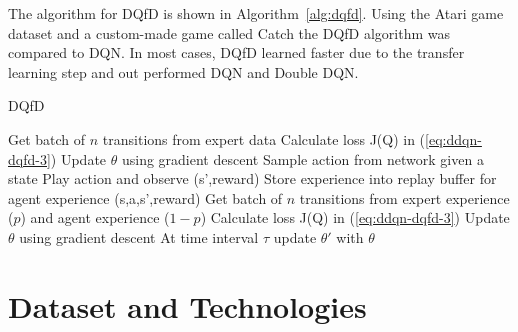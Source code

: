 \documentclass[12pt,american]{report}
\begin{document}
The algorithm for DQfD is shown in Algorithm~\ref{alg:dqfd}. Using the Atari game dataset and a custom-made game called Catch the DQfD algorithm was compared to DQN.  In most cases, DQfD learned faster due to the transfer learning step and out performed DQN and Double DQN.
\begin{algorithm}
\caption{DQfD~\cite{hester2017learning}}
\label{alg:dqfd}
\begin{algorithmic} 
\State Get batch of $n$ transitions from expert data
\State Calculate loss J(Q) in (\ref{eq:ddqn-dqfd-3})
\State Update $\theta$ using gradient descent
\EndFor
{}
\State Sample action from network given a state
\State Play action and observe (s',reward)
\State Store experience into replay buffer for agent experience (s,a,s',reward)
\State Get batch of $n$ transitions from expert experience ($p$) and agent experience ($1-p$)
\State Calculate loss J(Q) in (\ref{eq:ddqn-dqfd-3})
\State Update $\theta$ using gradient descent
\State At time interval $\tau$ update $\theta'$ with $\theta$
\EndFor
\end{algorithmic}
\end{algorithm}


\chapter{Dataset and Technologies}
\label{sec:datasetandtech}
\end{document}
